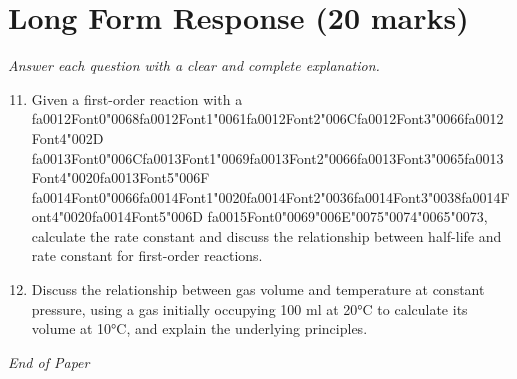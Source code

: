 \documentclass[12pt]{article}
\begin{document}
\section*{Long Form Response (20 marks)}
\textit{Answer each question with a clear and complete explanation.}
\begin{enumerate}[label=\arabic*.]
\setcounter{enumi}{10}
\item Given a first-order reaction with a {\csname fa0012Font0\endcsname\char"0068}{\csname fa0012Font1\endcsname\char"0061}{\csname fa0012Font2\endcsname\char"006C}{\csname fa0012Font3\endcsname\char"0066}{\csname fa0012Font4\endcsname\char"002D} {\csname fa0013Font0\endcsname\char"006C}{\csname fa0013Font1\endcsname\char"0069}{\csname fa0013Font2\endcsname\char"0066}{\csname fa0013Font3\endcsname\char"0065}{\csname fa0013Font4\endcsname\char"0020}{\csname fa0013Font5\endcsname\char"006F} {\csname fa0014Font0\endcsname\char"0066}{\csname fa0014Font1\endcsname\char"0020}{\csname fa0014Font2\endcsname\char"0036}{\csname fa0014Font3\endcsname\char"0038}{\csname fa0014Font4\endcsname\char"0020}{\csname fa0014Font5\endcsname\char"006D} {\csname fa0015Font0\endcsname\char"0069}{\char"006E}{\char"0075}{\char"0074}{\char"0065}{\char"0073}, calculate the rate constant
and discuss the relationship between half-life and rate constant for first-order
reactions.
\item Discuss the relationship between gas volume and temperature at constant pressure, using a
gas initially occupying 100 ml at 20°C to calculate its volume at 10°C, and explain the
underlying principles.
\end{enumerate}

\vfill
\noindent\textit{End of Paper}
\end{document}
